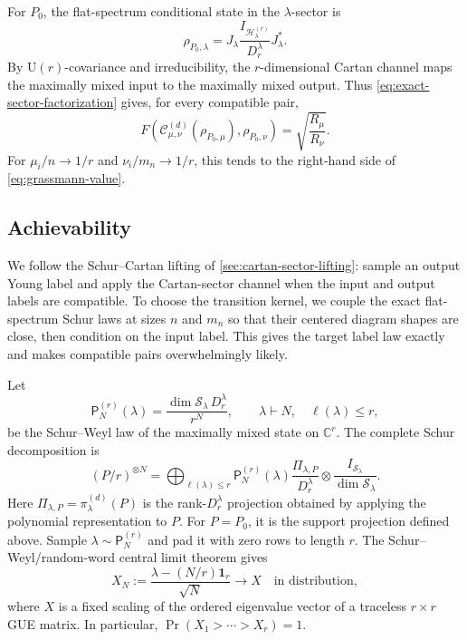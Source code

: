 \documentclass[11pt]{article}
\theoremstyle{remark}
\theoremstyle{plain}
\newcommand{\C}{\mathbb C}
\newcommand{\cC}{\mathcal C}
\newcommand{\cH}{\mathcal H}
\newcommand{\cS}{\mathcal S}
\newcommand{\U}{\mathrm U}
\newcommand{\ot}{\otimes}
\begin{document}
For \(P_0\), the flat-spectrum conditional state in the
\(\lambda\)-sector is
\begin{equation}\label{eq:projector-sector-state}
  \rho_{P_0,\lambda}
  =J_\lambda\frac{I_{\cH_\lambda^{(r)}}}{D_r^\lambda}J_\lambda^*.
\end{equation}
By \(\U(r)\)-covariance and irreducibility, the \(r\)-dimensional Cartan
channel maps the maximally mixed input to the maximally mixed output.
Thus \eqref{eq:exact-sector-factorization} gives, for every compatible pair,
\begin{equation}
  F\!\left(
    \cC_{\mu,\nu}^{(d)}(\rho_{P_0,\mu}),
    \rho_{P_0,\nu}
  \right)
  =\sqrt{\frac{R_\mu}{R_\nu}}.
  \label{eq:grassmann-exact-sector}
\end{equation}
For \(\mu_i/n\to1/r\) and \(\nu_i/m_n\to1/r\), this tends to the
right-hand side of \eqref{eq:grassmann-value}.

\subsection{Achievability}
\label{sec:grassmann-achievability}

We follow the Schur--Cartan lifting of
\cref{sec:cartan-sector-lifting}: sample an output Young label and apply
the Cartan-sector channel when the input and output labels are compatible.
To choose the transition kernel, we couple the exact flat-spectrum Schur
laws at sizes \(n\) and \(m_n\) so that their centered diagram shapes are
close, then condition on the input label.  This gives the target label law
exactly and makes compatible pairs overwhelmingly likely.

Let
\begin{equation}
  \mathsf P_N^{(r)}(\lambda)
  =\frac{\dim\cS_\lambda\,D_r^\lambda}{r^N},
  \qquad \lambda\vdash N,\quad\ell(\lambda)\le r,
  \label{eq:flat-schur-law}
\end{equation}
be the Schur--Weyl law of the maximally mixed state on \(\C^r\).  The
complete Schur decomposition is
\begin{equation}
  (P/r)^{\ot N}
  =\bigoplus_{\ell(\lambda)\le r}
   \mathsf P_N^{(r)}(\lambda)
   \frac{\Pi_{\lambda,P}}{D_r^\lambda}
   \ot\frac{I_{\cS_\lambda}}{\dim\cS_\lambda}.
  \label{eq:flat-schur-decomposition}
\end{equation}
Here \(\Pi_{\lambda,P}=\pi_\lambda^{(d)}(P)\) is the rank-\(D_r^\lambda\)
projection obtained by applying the polynomial representation to \(P\).
For \(P=P_0\), it is the support projection defined above.
Sample \(\lambda\sim\mathsf P_N^{(r)}\) and pad it with zero rows to length
\(r\).  The Schur--Weyl/random-word central limit theorem
\cite{Kuperberg2002,Johansson2001} gives
\begin{equation}
  X_N:=\frac{\lambda-(N/r)\mathbf1_r}{\sqrt N}
  \longrightarrow X
  \quad\text{in distribution},
  \label{eq:traceless-GUE-limit}
\end{equation}
where \(X\) is a fixed scaling of the ordered eigenvalue vector of a
traceless \(r\times r\) GUE matrix.  In particular,
\(\Pr(X_1>\cdots>X_r)=1\).
\end{document}
